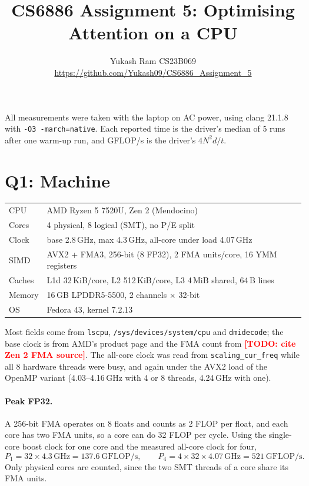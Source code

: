 \documentclass[11pt,a4paper]{article}
\title{CS6886 Assignment 5: Optimising Attention on a CPU}
\author{Yukash Ram CS23B069 \\ \small \url{https://github.com/Yukash09/CS6886_Assignment_5}}
\date{}
\newcommand{\todo}[1]{\textcolor{red}{\textbf{[TODO: #1]}}}
\begin{document}
\maketitle

\noindent All measurements were taken with the laptop on AC power, using clang 21.1.8 with
\texttt{-O3 -march=native}. Each reported time is the driver's median of 5 runs after one
warm-up run, and GFLOP/s is the driver's $4N^2d/t$.

\section*{Q1: Machine}

\begin{center}
\begin{tabular}{@{}ll@{}}
\toprule
CPU & AMD Ryzen 5 7520U, Zen 2 (Mendocino) \\
Cores & 4 physical, 8 logical (SMT), no P/E split \\
Clock & base 2.8\,GHz, max 4.3\,GHz, all-core under load 4.07\,GHz \\
SIMD & AVX2 + FMA3, 256-bit (8 FP32), 2 FMA units/core, 16 YMM registers \\
Caches & L1d 32\,KiB/core, L2 512\,KiB/core, L3 4\,MiB shared, 64\,B lines \\
Memory & 16\,GB LPDDR5-5500, 2 channels $\times$ 32-bit \\
OS & Fedora 43, kernel 7.2.13 \\
\bottomrule
\end{tabular}
\end{center}

\noindent Most fields come from \texttt{lscpu}, \texttt{/sys/devices/system/cpu} and
\texttt{dmidecode}; the base clock is from AMD's product page and the FMA count from
\todo{cite Zen 2 FMA source}. The all-core clock was read from \texttt{scaling\_cur\_freq}
while all 8 hardware threads were busy, and again under the AVX2 load of the OpenMP variant
(4.03--4.16\,GHz with 4 or 8 threads, 4.24\,GHz with one).

\paragraph{Peak FP32.} A 256-bit FMA operates on 8 floats and counts as 2 FLOP per float, and
each core has two FMA units, so a core can do 32 FLOP per cycle. Using the single-core boost
clock for one core and the measured all-core clock for four,
\[
  P_1 = 32 \times 4.3\,\text{GHz} = 137.6\ \text{GFLOP/s}, \qquad
  P_4 = 4 \times 32 \times 4.07\,\text{GHz} = 521\ \text{GFLOP/s}.
\]
Only physical cores are counted, since the two SMT threads of a core share its FMA units.
\end{document}
